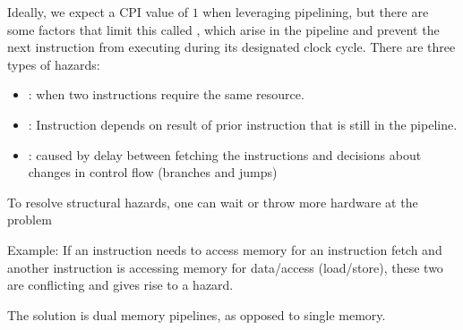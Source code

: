 \documentclass[12pt]{scrartcl}
\begin{document}
\begin{definition}[Hazards]
  Ideally, we expect a CPI value of $1$ when leveraging pipelining, but
  there are some factors that limit this called , which arise in the pipeline 
  and prevent the next instruction from executing during its designated clock cycle. 
  There are three types of hazards:
  \begin{itemize}
    \item {}: when two instructions require the same resource. 
    \item {}: Instruction depends on result of prior instruction that is still in the pipeline. 
    \item {}: caused by delay between fetching the instructions and decisions about changes in control flow (branches and jumps)
  \end{itemize}
\end{definition}

\begin{note}
  To resolve structural hazards, one can wait or throw more hardware at the problem
\end{note}

\begin{note}
  Example: If an instruction needs to access memory for an instruction fetch and 
  another instruction is accessing memory for data/access (load/store), these two are conflicting 
  and gives rise to a hazard. 

  The solution is dual memory pipelines, as opposed to single memory. 
\end{note}
\end{document}
